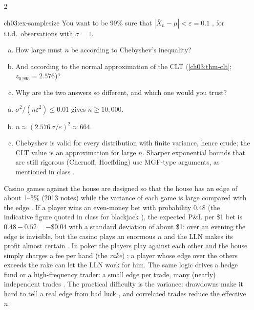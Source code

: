 \begin{paracol}{2}
\begin{tryfirst}{ch03:ex-samplesize}
You want to be 99\% sure that $|\bar X_n-\mu|<\varepsilon=0.1$ , for i.i.d.\ observations with $\sigma=1$.
\begin{enumerate}[(a)]
  \item How large must $n$ be according to Chebyshev's inequality?
  \item And according to the normal approximation of the CLT (\cref{ch03:thm-clt}; $z_{0.995}=2.576$)?
  \item Why are the two answers so different, and which one would you trust?
\end{enumerate}
\end{tryfirst}
\begin{solution}
\begin{enumerate}[(a)]
  \item $\sigma^2/(n\varepsilon^2)\le0.01$ gives $n\ge10{,}000$.
  \item $n\approx(2.576\,\sigma/\varepsilon)^2\approx664$.
  \item Chebyshev is valid for every distribution with finite variance, hence crude; the CLT value is an
        approximation for large $n$. Sharper exponential bounds that are still rigorous (Chernoff, Hoeffding) use
        MGF-type arguments, as mentioned in class .
\end{enumerate}
\end{solution}

\begin{finance}
Casino games against the house are designed so that the house has an edge of about 1--5\% (2013 notes)
while the variance of each game is large compared with the edge . If a player wins an
even-money bet with probability $0.48$ (the indicative figure quoted in class for blackjack
), the expected P\&L per \$1 bet is $0.48-0.52=-\$0.04$ with a standard deviation of about
\$1: over an evening the edge is invisible, but the casino plays an enormous $n$ and the LLN makes its
profit almost certain . In poker the players play against each other and the house simply
charges a fee per hand (the \emph{rake}) ; a player whose edge over the others exceeds the rake
can let the LLN work for him. The same logic drives a hedge fund or a high-frequency trader: a small edge
per trade, many (nearly) independent trades . The practical difficulty is the variance:
drawdowns make it hard to tell a real edge from bad luck , and correlated trades reduce the
effective $n$.
\end{finance}


\end{paracol}
